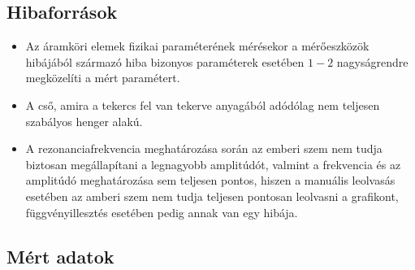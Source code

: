\documentclass[10pt,pdftex]{report}
\begin{document}
\subsection*{Hibaforrások}
\begin{itemize}
    \item{Az áramköri elemek fizikai paraméterének mérésekor a mérőeszközök hibájából származó hiba bizonyos paraméterek esetében
    $1-2$ nagyságrendre megközelíti a mért paramétert.}
    \item{A cső, amira a tekercs fel van tekerve anyagából adódólag nem teljesen szabályos henger alakú.}
    \item{A rezonanciafrekvencia meghatározása során az emberi szem nem tudja biztosan megállapítani a legnagyobb amplitúdót, valmint a frekvencia és az amplitúdó meghatározása
    sem teljesen pontos, hiszen a manuális leolvasás esetében az amberi szem nem tudja teljesen pontosan leolvasni a grafikont, függvényillesztés esetében pedig annak van egy hibája.}
\end{itemize}
\subsection*{Mért adatok}
\end{document}
